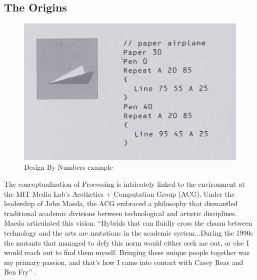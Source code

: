 
\subsection{The Origins}
\begin{figure}
    \includegraphics[max width=\textwidth]{images/dbn.png} 
    \caption[Design By Numbers example]{Design By Numbers example \parencite[66]{maedaDesignNumbers2001}}
    \label{fig:dbn}
  \end{figure}


 

The conceptualization of Processing is intricately linked to the environment at the MIT Media Lab’s Aesthetics + Computation Group (ACG). Under the leadership of John Maeda, the ACG embraced a philosophy that dismantled traditional academic divisions between technological and artistic disciplines. Maeda articulated this vision: \enquote{Hybrids that can fluidly cross the chasm between technology and the arts are mutations in the academic system...During the 1990s the mutants that managed to defy this norm would either seek me out, or else I would reach out to find them myself. Bringing these unique people together was my primary passion, and that’s how I came into contact with Casey Reas and Ben Fry} \parencite{reasProcessingProgrammingHandbook2007a}.

